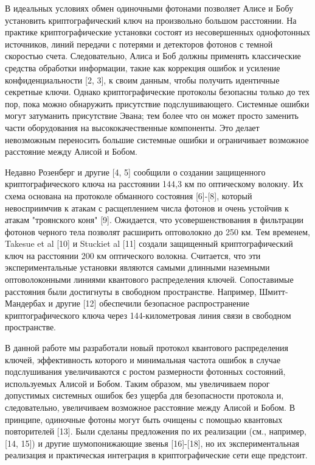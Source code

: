 В идеальных условиях обмен одиночными фотонами позволяет Алисе и Бобу установить криптографический ключ на произвольно большом расстоянии. На практике криптографические установки состоят из несовершенных однофотонных источников, линий передачи с потерями и детекторов фотонов с темной скоростью счета. Следовательно, Алиса и Боб должны применять классические средства обработки информации, такие как коррекция ошибок и усиление конфиденциальности [2, 3], к своим данным, чтобы получить идентичные секретные ключи. Однако криптографические протоколы безопасны только до тех пор, пока можно обнаружить присутствие подслушивающего. Системные ошибки могут затуманить присутствие Эвана; тем более что он может просто заменить части оборудования на высококачественные компоненты. Это делает невозможным переносить большие системные ошибки и ограничивает возможное расстояние между Алисой и Бобом.

Недавно Розенберг и другие [4, 5] сообщили о создании защищенного криптографического ключа на расстоянии 144,3 км по оптическому волокну. Их схема основана на протоколе обманного состояния [6]-[8], который невосприимчив к атакам с расщеплением числа фотонов и очень устойчив к атакам "троянского коня" [9]. Ожидается, что усовершенствования в фильтрации фотонов черного тела позволят расширить оптоволокно до 250 км. Тем временем, Takesue et al [10] и Stuckiet al [11] создали защищенный криптографический ключ на расстоянии 200 км оптического волокна. Считается, что эти экспериментальные установки являются самыми длинными наземными оптоволоконными линиями квантового распределения ключей. Сопоставимые расстояния были достигнуты в свободном пространстве. Например, Шмитт-Мандербах и другие [12] обеспечили безопасное распространение криптографического ключа через
144-километровая линия связи в свободном пространстве.

В данной работе мы разработали новый протокол квантового распределения ключей, эффективность которого и минимальная частота ошибок в случае подслушивания увеличиваются с ростом размерности фотонных состояний, используемых Алисой и Бобом. Таким образом, мы увеличиваем порог допустимых системных ошибок без ущерба для безопасности протокола и, следовательно, увеличиваем возможное расстояние между Алисой и Бобом. В принципе, одиночные фотоны могут быть очищены с помощью квантовых повторителей [13]. Были сделаны предложения по их реализации (см., например, [14, 15]) и другие шумопонижающие звенья [16]-[18], но их экспериментальная реализация и практическая интеграция в криптографические сети еще предстоит.

